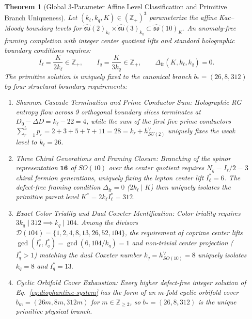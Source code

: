 \documentclass[11pt,letterpaper]{article}
\theoremstyle{plain}
\newtheorem{theorem}{Theorem}
\begin{document}
\begin{theorem}[Global 3-Parameter Affine Level Classification and Primitive Branch Uniqueness]
\label{thm:diophantine-uniqueness}
Let $(k_\ell, k_q, K) \in (\mathbb{Z}_+)^3$ parameterize the affine Kac--Moody boundary levels for $\widehat{\mathfrak{su}}(2)_{k_\ell} \times \widehat{\mathfrak{su}}(3)_{k_q} \subset \widehat{\mathfrak{so}}(10)_K$. An anomaly-free framing completion with integer center quotient lifts and standard holographic boundary conditions requires:
\begin{equation}
\label{eq:diophantine-system}
I_\ell = \frac{K}{2 k_\ell} \in \mathbb{Z}_+, \qquad I_q = \frac{K}{3 k_q} \in \mathbb{Z}_+, \qquad \Delta_{\mathrm{fr}}(K, k_\ell, k_q) = 0.
\end{equation}
The primitive solution is uniquely fixed to the canonical branch $b_* = (26, 8, 312)$ by four structural boundary requirements:
\begin{enumerate}
\item[(i)] \emph{Shannon Cascade Termination and Prime Conductor Sum:} Holographic RG entropy flow across 9 orthogonal boundary slices terminates at $D_0 - \Delta D = k_\ell - 22 = 4$, while the sum of the first five prime conductors $\sum_{r=1}^5 p_r = 2+3+5+7+11 = 28 = k_\ell + h^\vee_{SU(2)}$ uniquely fixes the weak level to $k_\ell = 26$.
\item[(ii)] \emph{Three Chiral Generations and Framing Closure:} Branching of the spinor representation $\mathbf{16}$ of $SO(10)$ over the center quotient requires $N_g = I_\ell / 2 = 3$ chiral fermion generations, uniquely fixing the lepton center lift $I_\ell^* = 6$. The defect-free framing condition $\Delta_{\mathrm{fr}} = 0$ ($2 k_\ell \mid K$) then uniquely isolates the primitive parent level $K^* = 2 k_\ell I_\ell^* = 312$.
\item[(iii)] \emph{Exact Color Triality and Dual Coxeter Identification:} Color triality requires $3 k_q \mid 312 \implies k_q \mid 104$. Among the divisors $\mathcal{D}(104) = \{1, 2, 4, 8, 13, 26, 52, 104\}$, the requirement of coprime center lifts $\gcd(I_\ell^*, I_q^*) = \gcd(6, 104/k_q) = 1$ and non-trivial center projection ($I_q^* > 1$) matching the dual Coxeter number $k_q = h^\vee_{SO(10)} = 8$ uniquely isolates $k_q = 8$ and $I_q^* = 13$.
\item[(iv)] \emph{Cyclic Orbifold Cover Exhaustion:} Every higher defect-free integer solution of Eq.~\eqref{eq:diophantine-system} has the form of an $m$-fold cyclic orbifold cover $b_m = (26m, 8m, 312m)$ for $m \in \mathbb{Z}_{\ge 2}$, so $b_* = (26, 8, 312)$ is the unique primitive physical branch.
\end{enumerate}
\end{theorem}
\end{document}
